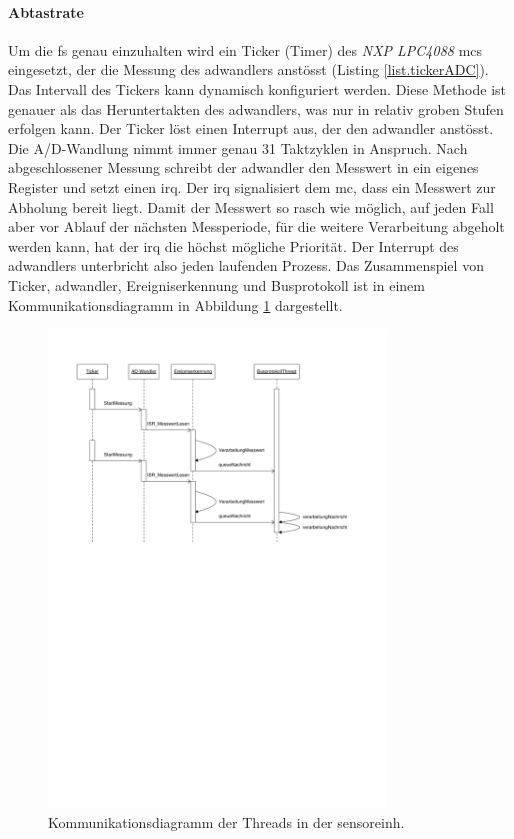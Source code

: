 \paragraph{Abtastrate} Um die \gls{fs} genau einzuhalten wird ein Ticker (Timer) des \emph{NXP LPC4088} \gls{mc}s eingesetzt, der die Messung des \gls{adwandler}s anstösst (Listing \ref{list.tickerADC}). Das Intervall des Tickers kann dynamisch konfiguriert werden. Diese Methode ist genauer als das Heruntertakten des \gls{adwandler}s, was nur in relativ groben Stufen erfolgen kann. Der Ticker löst einen Interrupt aus, der den \gls{adwandler} anstösst. Die A/D-Wandlung nimmt immer genau 31 Taktzyklen in Anspruch. Nach abgeschlossener Messung schreibt der \gls{adwandler} den Messwert in ein eigenes Register und setzt einen \gls{irq}. Der \gls{irq} signalisiert dem \gls{mc}, dass ein Messwert zur Abholung bereit liegt. Damit der Messwert so rasch wie möglich, auf jeden Fall aber vor Ablauf der nächsten Messperiode, für die weitere Verarbeitung abgeholt werden kann, hat der \gls{irq} die höchst mögliche Priorität. Der Interrupt des \gls{adwandler}s unterbricht also jeden laufenden Prozess. Das Zusammenspiel von Ticker,  \gls{adwandler}, Ereigniserkennung und Busprotokoll ist in einem Kommunikationsdiagramm in Abbildung \ref{fig.commsensor} dargestellt.

\begin{figure}
	\centering
		\includegraphics[width=0.8\textwidth]{images/visio/AD-Er-Com.pdf}
	\caption{Kommunikationsdiagramm der Threads in der \gls{sensoreinh}.}
	\label{fig.commsensor}
\end{figure}


